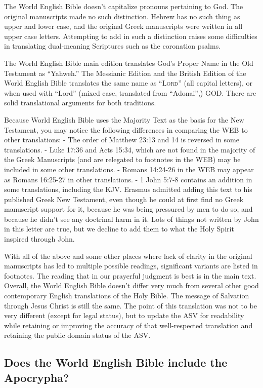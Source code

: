 The World English Bible doesn't capitalize pronouns pertaining to God.
The original manuscripts made no such distinction. Hebrew has no such
thing as upper and lower case, and the original Greek manuscripts were
written in all upper case letters. Attempting to add in such a
distinction raises some difficulties in translating dual-meaning
Scriptures such as the coronation psalms.

The World English Bible main edition translates God's Proper Name in the
Old Testament as ``Yahweh.'' The Messianic Edition and the British
Edition of the World English Bible translates the same name as
``\textsc{Lord}'' (all capital letters), or when used with ``Lord''
(mixed case, translated from ``Adonai'',) GOD. There are solid
translational arguments for both traditions.

Because World English Bible uses the Majority Text as the basis for the
New Testament, you may notice the following differences in comparing the
WEB to other translations: - The order of Matthew 23:13 and 14 is
reversed in some translations. - Luke 17:36 and Acts 15:34, which are
not found in the majority of the Greek Manuscripts (and are relegated to
footnotes in the WEB) may be included in some other translations. -
Romans 14:24-26 in the WEB may appear as Romans 16:25-27 in other
translations. - 1 John 5:7-8 contains an addition in some translations,
including the KJV. Erasmus admitted adding this text to his published
Greek New Testament, even though he could at first find no Greek
manuscript support for it, because he was being pressured by men to do
so, and because he didn't see any doctrinal harm in it. Lots of things
not written by John in this letter are true, but we decline to add them
to what the Holy Spirit inspired through John.

With all of the above and some other places where lack of clarity in the
original manuscripts has led to multiple possible readings, significant
variants are listed in footnotes. The reading that in our prayerful
judgment is best is in the main text. Overall, the World English Bible
doesn't differ very much from several other good contemporary English
translations of the Holy Bible. The message of Salvation through Jesus
Christ is still the same. The point of this translation was not to be
very different (except for legal status), but to update the ASV for
readability while retaining or improving the accuracy of that
well-respected translation and retaining the public domain status of the
ASV.

\hypertarget{does-the-world-english-bible-include-the-apocrypha}{%
\subsection{Does the World English Bible include the
Apocrypha?}\label{does-the-world-english-bible-include-the-apocrypha}}

